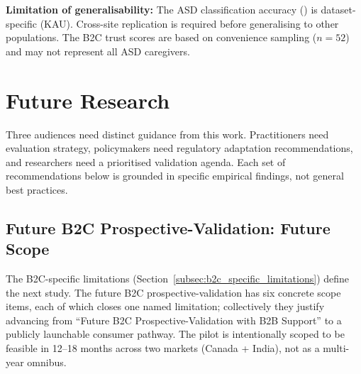 \noindent\textbf{Limitation of generalisability:} The ASD classification accuracy (\asdacc{}) is dataset-specific (KAU). Cross-site replication is required before generalising to other populations. The B2C trust scores are based on convenience sampling ($n = 52$) and may not represent all ASD caregivers.

\section{Future Research}



Three audiences need distinct guidance from this work. Practitioners need evaluation strategy, policymakers need regulatory adaptation recommendations, and researchers need a prioritised validation agenda. Each set of recommendations below is grounded in specific empirical findings, not general best practices.

\subsection{Future B2C Prospective-Validation: Future Scope}
\label{subsec:b2c_pilot_future_scope}

The B2C-specific limitations (Section~\ref{subsec:b2c_specific_limitations}) define the next study. The future B2C prospective-validation has six concrete scope items, each of which closes one named limitation; collectively they justify advancing from ``Future B2C Prospective-Validation with B2B Support'' to a publicly launchable consumer pathway. The pilot is intentionally scoped to be feasible in 12--18 months across two markets (Canada + India), not as a multi-year omnibus.

